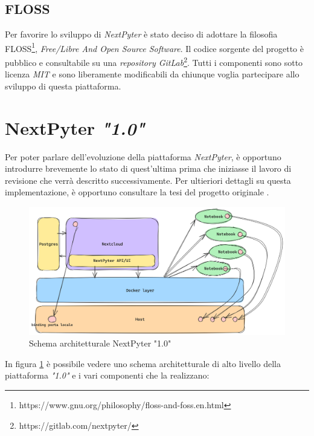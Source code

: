 \subsection{FLOSS}
Per favorire lo sviluppo di \textit{NextPyter} è stato deciso di adottare la filosofia FLOSS\footnote{https://www.gnu.org/philosophy/floss-and-foss.en.html}, \textit{Free/Libre And Open Source Software}. Il codice sorgente del progetto è pubblico e consultabile su una \textit{repository GitLab}\footnote{https://gitlab.com/nextpyter/}. Tutti i componenti sono sotto licenza \textit{MIT} e sono liberamente modificabili da chiunque voglia partecipare allo sviluppo di questa piattaforma.

\newpage

\section{NextPyter \textit{"1.0"}}
Per poter parlare dell'evoluzione della piattaforma \textit{NextPyter}, è opportuno introdurre brevemente lo stato di quest'ultima prima che iniziasse il lavoro di revisione che verrà descritto successivamente.
\newline
Per ultieriori dettagli su questa implementazione, è opportuno consultare la tesi del progetto originale \cite{nextpyter-1}.
\newline
\begin{figure}[h]
    \centering
    \includegraphics[width=1\textwidth]{files/images/nextpyter-1-0.png}
    \caption{Schema architetturale NextPyter "1.0"}
    \label{fig:nextpyter-1-0-architecture}
\end{figure}
\newline
In figura \ref{fig:nextpyter-1-0-architecture} è possibile vedere uno schema architetturale di alto livello della piattaforma \textit{"1.0"} e i vari componenti che la realizzano:
